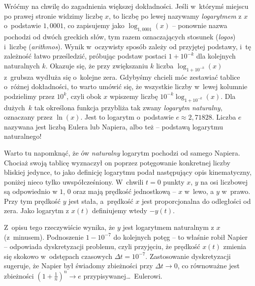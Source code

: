 Wróćmy na chwilę do zagadnienia większej dokładności. Jeśli w~którymś miejscu po prawej stronie widzimy liczbę $x$, to liczbę po lewej nazywamy \emph{logarytmem} z $x$ o~podstawie $1{,}0001$, co zapisujemy jako $\log_{1{,}0001}(x)$ -- ponownie nazwa pochodzi od dwóch greckich słów, tym razem oznaczających stosunek (\emph{logos}) i~liczbę (\emph{arithmos}). Wynik w~oczywisty sposób zależy od przyjętej podstawy, i~tę zależność łatwo prześledzić, próbując podstaw postaci $1+10^{-k}$ dla kolejnych naturalnych $k$. Okazuje się, że przy zwiększaniu $k$ liczba $\log_{1+10^{-k}}(x)$ z~grubsza wydłuża się o~kolejne zera. Gdybyśmy chcieli móc zestawiać tablice o~różnej dokładności, to warto umówić się, że wszystkie liczby w~lewej kolumnie podzielimy przez $10^k$, czyli obok $x$ wpiszemy liczbę $10^{-k} \log_{1+10^{-k}}(x)$. Dla dużych~$k$ tak określona funkcja przybliża tak zwany \emph{logarytm naturalny}, oznaczany przez $\ln(x)$. Jest to logarytm o~podstawie $e \approx 2{,}71828$. Liczba $e$ nazywana jest liczbą Eulera lub Napiera, albo też -- podstawą logarytmu naturalnego! 

Warto tu napomknąć, 
że ów \emph{naturalny} logarytm pochodzi od samego Napiera. 
Chociaż swoją tablicę wyznaczył on poprzez potęgowanie konkretnej liczby bliskiej jedynce, to jako definicję logarytmu podał następujący opis kinematyczny, poniżej nieco tylko uwspółcześniony. W~chwili $t = 0$ punkty $x$, $y$ na osi liczbowej są odpowiednio w $1$, $0$ oraz mają prędkość jednostkową -- $x$ w~lewo, a $y$ w~prawo. Przy tym prędkość $y$ jest stała, a~prędkość $x$ jest proporcjonalna do odległości od zera. Jako logarytm z $x(t)$ definiujemy wtedy $-y(t)$.

Z~opisu tego rzeczywiście wynika, że $y$ jest logarytmem naturalnym z $x$ (z~minusem). Podnoszenie $1-10^{-7}$ do kolejnych potęg -- to właśnie robił Napier -- odpowiada dyskretyzacji problemu, czyli przyjęciu, że prędkość $x(t)$ zmienia się skokowo w~odstępach czasowych $\Delta t = 10^{-7}$. Zastosowanie dyskretyzacji sugeruje, że Napier był świadomy zbieżności przy $\Delta t \to 0$, co równoważne jest zbieżności $(1 + \frac 1n)^n \to e$ przypisywanej\dots\ Eulerowi. 

